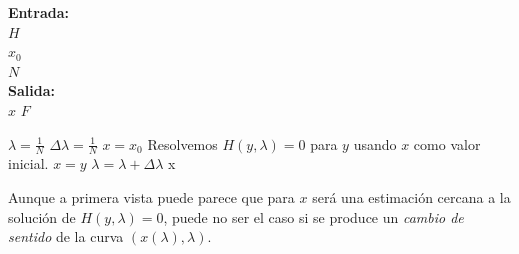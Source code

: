 \begin{algorithm}[H]
	\label{embedding-alg}
	\textbf{Entrada: } \\
	\hspace*{\algorithmicindent} $H$  \\
	\hspace*{\algorithmicindent} $x_0$  \\
	\hspace*{\algorithmicindent} $N$  \\
	\textbf{Salida:} \\
	\hspace*{\algorithmicindent} $x$  $F$
	\begin{algorithmic}
		\Procedure {}{}
		\State $\lambda = \frac{1}{N}$
		\State $\Delta \lambda = \frac{1}{N}$
		\State $x = x_0$
		\State Resolvemos $H(y,\lambda) = 0 $ para $y$ usando $x$ como valor inicial.
		\State $x = y$
		\State $\lambda = \lambda + \Delta \lambda$
		\EndFor
		\State \Return x 
		\EndProcedure
	\end{algorithmic}
\end{algorithm}

Aunque a primera vista puede parece que para $x$ será una estimación cercana a la solución de $H(y,\lambda)=0$, puede no ser el caso si se produce un \textit{cambio de sentido} de la curva $(x(\lambda),\lambda)$.

